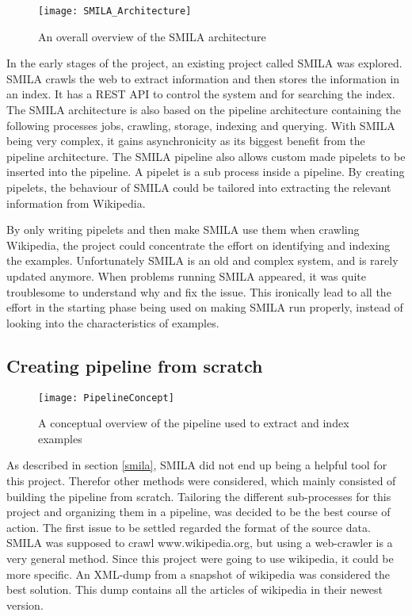 \begin{figure}[h]
\caption{An overall overview of the SMILA architecture}
\texttt{[image: SMILA\_Architecture]}
\end{figure}

In the early stages of the project, an existing project called SMILA was explored. SMILA crawls the web to extract information and then stores the information in an index. It has a REST API to control the system and for searching the index. The SMILA architecture is also based on the pipeline architecture containing the following processes jobs, crawling, storage, indexing and querying. With SMILA being very complex, it gains asynchronicity as its biggest benefit from the pipeline architecture. The SMILA pipeline also allows custom made pipelets to be inserted into the pipeline. A pipelet is a sub process inside a pipeline. By creating pipelets, the behaviour of SMILA could be tailored into extracting the relevant information from Wikipedia.

By only writing pipelets and then make SMILA use them when crawling Wikipedia, the project could concentrate the effort on identifying and indexing the examples. Unfortunately SMILA is an old and complex system, and is rarely updated anymore. When problems running SMILA appeared, it was quite troublesome to understand why and fix the issue. This ironically lead to all the effort in the starting phase being used on making SMILA run properly, instead of looking into the characteristics of examples. 



\subsection{Creating pipeline from scratch} \label{custom-pipeline}

\begin{figure}[h]
\caption{A conceptual overview of the pipeline used to extract and index examples}
\texttt{[image: PipelineConcept]}
\end{figure}

As described in section \ref{smila}, SMILA did not end up being a helpful tool for this project. Therefor other methods were considered, which mainly consisted of building the pipeline from scratch. Tailoring the different sub-processes for this project and organizing them in a pipeline, was decided to be the best course of action. The first issue to be settled regarded the format of the source data. SMILA was supposed to crawl www.wikipedia.org, but using a web-crawler is a very general method. Since this project were going to use wikipedia, it could be more specific. An XML-dump from a snapshot of wikipedia was considered the best solution. This dump contains all the articles of wikipedia in their newest version.

